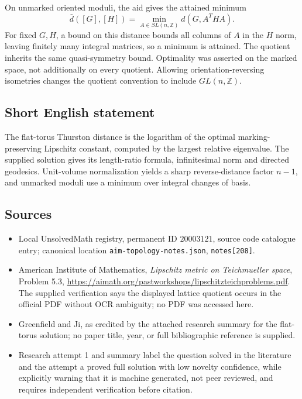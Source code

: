 \documentclass[11pt]{article}
\newcommand{\Z}{\mathbb{Z}}
\begin{document}
On unmarked oriented moduli, the aid gives the attained minimum
\[
 \bar d([G],[H])=\min_{A\in SL(n,\Z)}d(G,A^THA).
\]
For fixed $G,H$, a bound on this distance bounds all columns of $A$ in the $H$ norm, leaving finitely many integral matrices, so a minimum is attained. The quotient inherits the same quasi-symmetry bound. Optimality was asserted on the marked space, not additionally on every quotient. Allowing orientation-reversing isometries changes the quotient convention to include $GL(n,\Z)$.
\subsection{Short English statement}
The flat-torus Thurston distance is the logarithm of the optimal marking-preserving Lipschitz constant, computed by the largest relative eigenvalue. The supplied solution gives its length-ratio formula, infinitesimal norm and directed geodesics. Unit-volume normalization yields a sharp reverse-distance factor $n-1$, and unmarked moduli use a minimum over integral changes of basis.
\subsection{Sources}
\begin{itemize}
\item Local UnsolvedMath registry, permanent ID $20003121$, source code catalogue entry; canonical location \texttt{aim-topology-notes.json}, \texttt{notes[208]}.
\item American Institute of Mathematics, \emph{Lipschitz metric on Teichmueller space}, Problem 5.3, \url{https://aimath.org/pastworkshops/lipschitzteichproblems.pdf}. The supplied verification says the displayed lattice quotient occurs in the official PDF without OCR ambiguity; no PDF was accessed here.
\item Greenfield and Ji, as credited by the attached research summary for the flat-torus solution; no paper title, year, or full bibliographic reference is supplied.
\item Research attempt 1 and summary label the question solved in the literature and the attempt a proved full solution with low novelty confidence, while explicitly warning that it is machine generated, not peer reviewed, and requires independent verification before citation.
\end{itemize}
\end{document}
